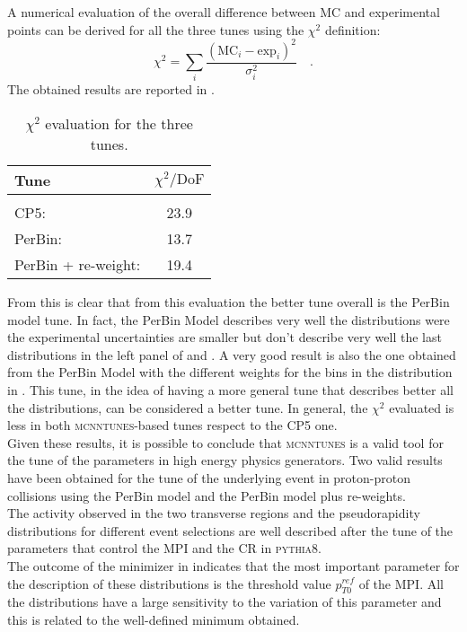 \medskip

A numerical evaluation of the overall difference between MC and experimental points can be derived  for all the three tunes using the $\chi^2$ definition:
\begin{equation}
	\chi^2=\displaystyle\sum_i\frac{(\text{MC}_i-\text{exp}_i)^2}{\sigma_i^2}\quad.
\end{equation}
The obtained results are reported in . 
\begin{table}[!htb]
	\centering
	\begin{tabular}{l  c }
		Tune & $\chi^2/\mathrm{DoF}$\\[2pt]\hline\hline
		\\[-0.85em]
		CP5: & 23.9\\[2pt]
		PerBin: & 13.7\\[2pt]
		PerBin + re-weight: & 19.4\\[2pt]
	\end{tabular}
	\caption{$\chi^2$ evaluation for the three tunes.}
	\label{table:chi2_MinBias}
\end{table}
From this is clear that from this evaluation the better tune overall is the PerBin model tune. In fact, the PerBin Model describes very well the distributions were the experimental uncertainties are smaller but don't describe very well the last distributions in the left panel of  and . A very good result is also the one obtained from the PerBin Model with the different weights for the bins in the distribution in . This tune, in the idea of having a more general tune that describes better all the distributions, can be considered a better tune. In general, the $\chi^2$ evaluated is less in both \textsc{mcnntunes}-based tunes respect to the CP5 one. 
\\
Given these results, it is possible to conclude that \textsc{mcnntunes} is a valid tool for the tune of the parameters in high energy physics generators. Two valid results have been obtained for the tune of the underlying event in proton-proton collisions using the PerBin model and the PerBin model plus re-weights.
\\
The activity observed in the two transverse regions and the pseudorapidity distributions for different event selections are well described after the tune of the parameters that control the MPI and the CR in \textsc{pythia8}. 
\\
The outcome of the minimizer in  indicates  that the most important parameter for the description of these distributions is the threshold value $p_{T0}^{ref}$ of the MPI. All the distributions have a large sensitivity to the variation of this parameter and this is related to the well-defined minimum obtained.
